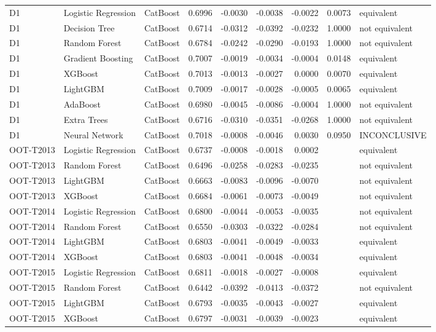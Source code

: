 \begin{tabular}{lllrrrrrl}
D1 & Logistic Regression & CatBoost & 0.6996 & -0.0030 & -0.0038 & -0.0022 & 0.0073 & equivalent \\
D1 & Decision Tree & CatBoost & 0.6714 & -0.0312 & -0.0392 & -0.0232 & 1.0000 & not equivalent \\
D1 & Random Forest & CatBoost & 0.6784 & -0.0242 & -0.0290 & -0.0193 & 1.0000 & not equivalent \\
D1 & Gradient Boosting & CatBoost & 0.7007 & -0.0019 & -0.0034 & -0.0004 & 0.0148 & equivalent \\
D1 & XGBoost & CatBoost & 0.7013 & -0.0013 & -0.0027 & 0.0000 & 0.0070 & equivalent \\
D1 & LightGBM & CatBoost & 0.7009 & -0.0017 & -0.0028 & -0.0005 & 0.0065 & equivalent \\
D1 & AdaBoost & CatBoost & 0.6980 & -0.0045 & -0.0086 & -0.0004 & 1.0000 & not equivalent \\
D1 & Extra Trees & CatBoost & 0.6716 & -0.0310 & -0.0351 & -0.0268 & 1.0000 & not equivalent \\
D1 & Neural Network & CatBoost & 0.7018 & -0.0008 & -0.0046 & 0.0030 & 0.0950 & INCONCLUSIVE \\
OOT-T2013 & Logistic Regression & CatBoost & 0.6737 & -0.0008 & -0.0018 & 0.0002 &  & equivalent \\
OOT-T2013 & Random Forest & CatBoost & 0.6496 & -0.0258 & -0.0283 & -0.0235 &  & not equivalent \\
OOT-T2013 & LightGBM & CatBoost & 0.6663 & -0.0083 & -0.0096 & -0.0070 &  & not equivalent \\
OOT-T2013 & XGBoost & CatBoost & 0.6684 & -0.0061 & -0.0073 & -0.0049 &  & not equivalent \\
OOT-T2014 & Logistic Regression & CatBoost & 0.6800 & -0.0044 & -0.0053 & -0.0035 &  & not equivalent \\
OOT-T2014 & Random Forest & CatBoost & 0.6550 & -0.0303 & -0.0322 & -0.0284 &  & not equivalent \\
OOT-T2014 & LightGBM & CatBoost & 0.6803 & -0.0041 & -0.0049 & -0.0033 &  & equivalent \\
OOT-T2014 & XGBoost & CatBoost & 0.6803 & -0.0041 & -0.0048 & -0.0034 &  & equivalent \\
OOT-T2015 & Logistic Regression & CatBoost & 0.6811 & -0.0018 & -0.0027 & -0.0008 &  & equivalent \\
OOT-T2015 & Random Forest & CatBoost & 0.6442 & -0.0392 & -0.0413 & -0.0372 &  & not equivalent \\
OOT-T2015 & LightGBM & CatBoost & 0.6793 & -0.0035 & -0.0043 & -0.0027 &  & equivalent \\
OOT-T2015 & XGBoost & CatBoost & 0.6797 & -0.0031 & -0.0039 & -0.0023 &  & equivalent \\
\bottomrule
\end{tabular}
